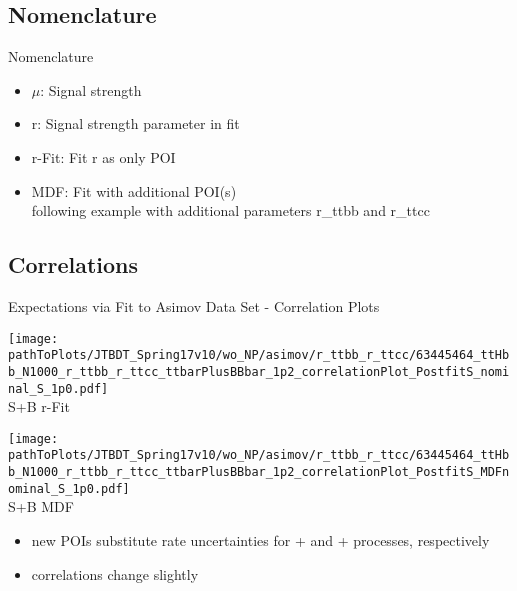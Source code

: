 \subsection{Nomenclature}
\begin{frame}{Nomenclature}
\begin{itemize}
\item $\mu$: Signal strength
\item r: Signal strength parameter in fit
\item r-Fit: Fit r as only POI
\item MDF: Fit with additional POI(s)\\
\rar following example with additional parameters r\_ttbb and r\_ttcc

\end{itemize}
\end{frame}

\subsection{Correlations}
\begin{frame}{Expectations via Fit to Asimov Data Set - Correlation Plots}

\begin{minipage}{0.48\textwidth}
\begin{center}
\texttt{[image: \\pathToPlots/JTBDT\_Spring17v10/wo\_NP/asimov/r\_ttbb\_r\_ttcc/63445464\_ttHbb\_N1000\_r\_ttbb\_r\_ttcc\_ttbarPlusBBbar\_1p2\_correlationPlot\_PostfitS\_nominal\_S\_1p0.pdf]}\\
\vskip -0.3cm
S+B r-Fit
\end{center}
\end{minipage}
\hfill
\begin{minipage}{0.48\textwidth}
\begin{center}
\texttt{[image: \\pathToPlots/JTBDT\_Spring17v10/wo\_NP/asimov/r\_ttbb\_r\_ttcc/63445464\_ttHbb\_N1000\_r\_ttbb\_r\_ttcc\_ttbarPlusBBbar\_1p2\_correlationPlot\_PostfitS\_MDFnominal\_S\_1p0.pdf]}\\
\vskip -0.3cm
S+B MDF
\end{center}
\end{minipage}
\begin{itemize}
\item new POIs substitute rate uncertainties for \ttbar + \bbbar and \ttbar + \ccbar processes, respectively
\item correlations change slightly
\end{itemize}
\end{frame}

